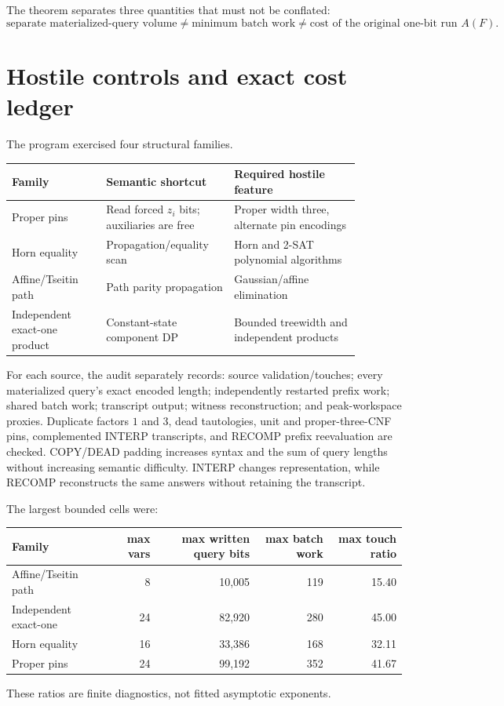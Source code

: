 \documentclass[11pt]{article}
\begin{document}
The theorem separates three quantities that must not be conflated:
\[
\text{separate materialized-query volume}
\ne
\text{minimum batch work}
\ne
\text{cost of the original one-bit run }A(F).
\tag{4}
\]

\section{Hostile controls and exact cost ledger}
The program exercised four structural families.
\begin{center}
\begin{tabular}{p{0.24\linewidth}p{0.32\linewidth}p{0.32\linewidth}}
\toprule
Family & Semantic shortcut & Required hostile feature\\
\midrule
Proper pins & Read forced $z_i$ bits; auxiliaries are free & Proper width three, alternate pin encodings\\
Horn equality & Propagation/equality scan & Horn and 2-SAT polynomial algorithms\\
Affine/Tseitin path & Path parity propagation & Gaussian/affine elimination\\
Independent exact-one product & Constant-state component DP & Bounded treewidth and independent products\\
\bottomrule
\end{tabular}
\end{center}

For each source, the audit separately records: source validation/touches;
every materialized query's exact encoded length; independently restarted
prefix work; shared batch work; transcript output; witness reconstruction;
and peak-workspace proxies.  Duplicate factors $1$ and $3$, dead tautologies,
unit and proper-three-CNF pins, complemented INTERP transcripts, and RECOMP
prefix reevaluation are checked.  COPY/DEAD padding increases syntax and the
sum of query lengths without increasing semantic difficulty.  INTERP changes
representation, while RECOMP reconstructs the same answers without retaining
the transcript.

The largest bounded cells were:
\begin{center}
\begin{tabular}{lrrrr}
\toprule
Family & max vars & max written query bits & max batch work & max touch ratio\\
\midrule
Affine/Tseitin path & 8 & 10,005 & 119 & 15.40\\
Independent exact-one & 24 & 82,920 & 280 & 45.00\\
Horn equality & 16 & 33,386 & 168 & 32.11\\
Proper pins & 24 & 99,192 & 352 & 41.67\\
\bottomrule
\end{tabular}
\end{center}
These ratios are finite diagnostics, not fitted asymptotic exponents.
\end{document}
